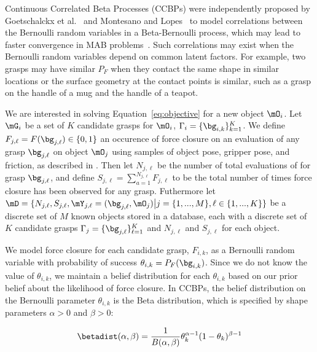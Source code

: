 Continuous Correlated Beta Processes (CCBPs) were independently proposed by Goetschalckx et al.~\cite{goetschalckx2011continuous} and Montesano and Lopes~\cite{montesano2012active} to model correlations between the Bernoulli random variables in a Beta-Bernoulli process, which may lead to faster convergence in MAB problems~\cite{chu2011contextual}.
Such correlations may exist when the Bernoulli random variables depend on common latent factors.
For example, two grasps may have similar $P_F$ when they contact the same shape in similar locations or the surface geometry at the contact points is similar, such as a grasp on the handle of a mug and the handle of a teapot.

We are interested in solving Equation~\ref{eq:objective} for a new object $\mO_i$.
Let $\mG_{i}$ be a set of $K$ candidate grasps for $\mO_i$, $\Gamma_i = \{\bg_{i,k}\}_{k=1}^K$.
We define $F_{j,\ell} = F(\bg_{j,\ell}) \in \{0, 1\}$ an occurence of force closure on an evaluation of any grasp $\bg_{j,\ell}$ on object $\mO_j$ using samples of object pose, gripper pose, and friction, as described in .
Then let $N_{j,\ell}$ be the number of total evaluations of for grasp $\bg_{j,\ell}$, and define $S_{j,\ell} = \sum_{a=1}^{N_{j,\ell}} F_{j,\ell}$ to be the total number of times force closure has been observed for any grasp.
Futhermore let $\mD = \{ N_{j,\ell}, S_{j,\ell}, \mY_{j,\ell} = (\bg_{j,\ell}, \mO_j) \big| j = \{1, ..., M\}, \ell \in \{1, ..., K\} \}$ be a discrete set of $M$ known objects stored in a database, each with a discrete set of $K$ candidate grasps $\Gamma_j = \{\bg_{j,\ell}\}_{\ell=1}^K$ and $N_{j,\ell}$ and $S_{j,\ell}$ for each object.


We model force closure for each candidate grasp, $F_{i,k}$, as a Bernoulli random variable with probability of success $\theta_{i,k}= P_F(\bg_{i,k})$.
Since we do not know the value of $\theta_{i,k}$, we maintain a belief distribution for each $\theta_{i,k}$ based on our prior belief about the likelihood of force closure.
In CCBPs, the belief distribution on the Bernoulli parameter $\theta_{i,k}$ is the Beta distribution, which is specified by shape parameters $\alpha > 0$ and $\beta > 0$:

\vspace{-2ex}
\begin{align*}
	\betadist(\alpha, \beta) = \frac{1}{B(\alpha, \beta)} \theta_k^{\alpha-1} (1 - \theta_k)^{\beta-1}
\end{align*}

